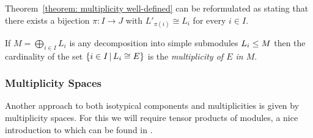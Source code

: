 \begin{remark}
  \label{remark: uniqueness of multiplicities alternative formulation}
  Theorem~\ref{theorem: multiplicity well-defined} can be reformulated as stating that there exists a bijection $\pi \colon I \to J$ with $L'_{\pi(i)} \cong L_i$ for every $i \in I$.
\end{remark}


\begin{definition}
  If $M = \bigoplus_{i \in I} L_i$ is any decomposition into simple submodules $L_i \leq M$ then the cardinality of the set $\{i \in I \suchthat L_i \cong E\}$ is the \emph{multiplicity of $E$ in $M$}.
\end{definition}





\subsubsection{Multiplicity Spaces}


\begin{fluff}
  Another approach to both isotypical components and multiplicities is given by multiplicity spaces.
  For this we will require tensor products of modules, a nice introduction to which can be found in \cite[Chapter 10.4]{DummitFoote2004}.
\end{fluff}


